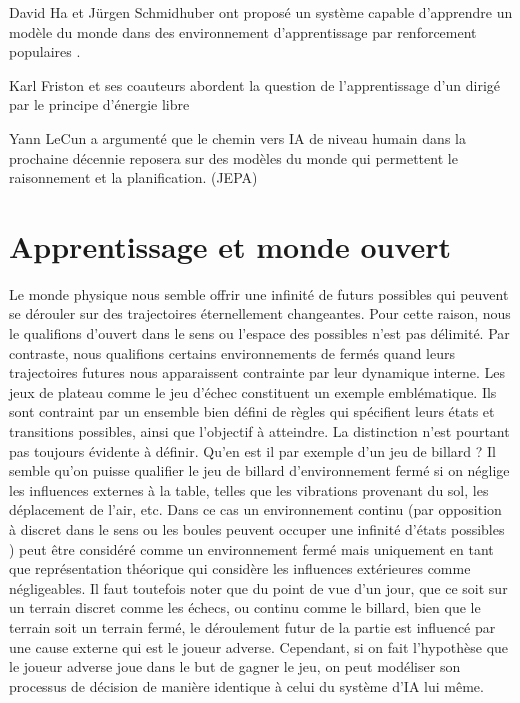 David Ha et Jürgen Schmidhuber ont proposé un système capable d'apprendre un modèle du monde dans des environnement d'apprentissage par renforcement populaires \cite{ha_world_2018}.

Karl Friston et ses coauteurs abordent la question de l'apprentissage d'un  dirigé par le principe d'énergie libre \cite{friston_world_2021}

Yann LeCun a argumenté que le chemin vers IA de niveau humain dans la prochaine décennie reposera sur des modèles du monde qui permettent le raisonnement et la planification.
\og {} \fg (JEPA) \cite{balestriero_lejepa_2025}


\section{Apprentissage et monde \og ouvert \fg}

Le monde physique nous semble offrir une infinité de futurs possibles qui peuvent se dérouler sur des trajectoires éternellement changeantes. 
Pour cette raison, nous le qualifions \og d'ouvert \fg dans le sens ou l'espace des possibles n'est pas délimité.
Par contraste, nous qualifions certains environnements de \og fermés \fg quand leurs trajectoires futures nous apparaissent contrainte par leur dynamique interne. 
Les jeux de plateau comme le jeu d'échec constituent un exemple emblématique. 
Ils sont contraint par un ensemble bien défini de règles qui spécifient leurs états et transitions possibles, ainsi que l'objectif à atteindre. 
La distinction n'est pourtant pas toujours évidente à définir. 
Qu'en est il par exemple d'un jeu de billard ? 
Il semble qu'on puisse qualifier le jeu de billard d'environnement fermé si on néglige les influences externes à la table, telles que les vibrations provenant du sol, les déplacement de l'air, etc. 
Dans ce cas un environnement \og continu \fg (par opposition à \og discret \fg dans le sens ou les boules peuvent occuper une infinité d'états possibles ) peut être considéré comme un environnement fermé mais uniquement en tant que représentation théorique qui considère les influences extérieures comme négligeables. 
Il faut toutefois noter que du point de vue d'un jour, que ce soit sur un terrain discret comme les échecs, ou continu comme le billard, bien que le terrain soit un terrain fermé, le déroulement futur de la partie est influencé par une cause externe qui est le joueur adverse. 
Cependant, si on fait l'hypothèse que le joueur adverse joue dans le but de gagner le jeu, on peut modéliser son processus de décision de manière identique à celui du système d'IA lui même. 

